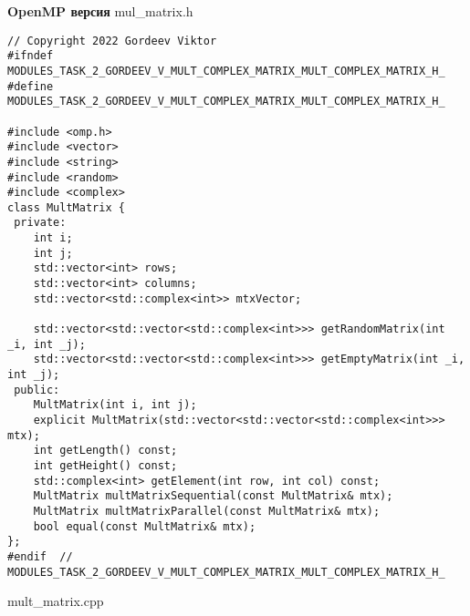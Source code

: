 \documentclass{report}
\begin{document}
\textbf{OpenMP версия}
\newline
\newline mul_matrix.h
\begin{lstlisting}
// Copyright 2022 Gordeev Viktor
#ifndef MODULES_TASK_2_GORDEEV_V_MULT_COMPLEX_MATRIX_MULT_COMPLEX_MATRIX_H_
#define MODULES_TASK_2_GORDEEV_V_MULT_COMPLEX_MATRIX_MULT_COMPLEX_MATRIX_H_

#include <omp.h>
#include <vector>
#include <string>
#include <random>
#include <complex>
class MultMatrix {
 private:
    int i;
    int j;
    std::vector<int> rows;
    std::vector<int> columns;
    std::vector<std::complex<int>> mtxVector;

    std::vector<std::vector<std::complex<int>>> getRandomMatrix(int _i, int _j);
    std::vector<std::vector<std::complex<int>>> getEmptyMatrix(int _i, int _j);
 public:
    MultMatrix(int i, int j);
    explicit MultMatrix(std::vector<std::vector<std::complex<int>>> mtx);
    int getLength() const;
    int getHeight() const;
    std::complex<int> getElement(int row, int col) const;
    MultMatrix multMatrixSequential(const MultMatrix& mtx);
    MultMatrix multMatrixParallel(const MultMatrix& mtx);
    bool equal(const MultMatrix& mtx);
};
#endif  // MODULES_TASK_2_GORDEEV_V_MULT_COMPLEX_MATRIX_MULT_COMPLEX_MATRIX_H_

\end{lstlisting}
mult_matrix.cpp
\end{document}
